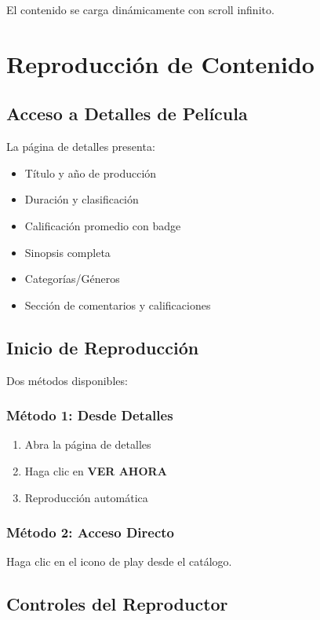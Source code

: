 \documentclass[11pt,a4paper,twoside]{book}
\begin{document}
El contenido se carga dinámicamente con scroll infinito.

\chapter{Reproducción de Contenido}

\section{Acceso a Detalles de Película}

La página de detalles presenta:
\begin{itemize}
    \item Título y año de producción
    \item Duración y clasificación
    \item Calificación promedio con badge
    \item Sinopsis completa
    \item Categorías/Géneros
    \item Sección de comentarios y calificaciones
\end{itemize}

\section{Inicio de Reproducción}

Dos métodos disponibles:

\subsection{Método 1: Desde Detalles}
\begin{enumerate}
    \item Abra la página de detalles
    \item Haga clic en \textbf{VER AHORA}
    \item Reproducción automática
\end{enumerate}

\subsection{Método 2: Acceso Directo}
Haga clic en el icono de play desde el catálogo.

\section{Controles del Reproductor}
\end{document}
